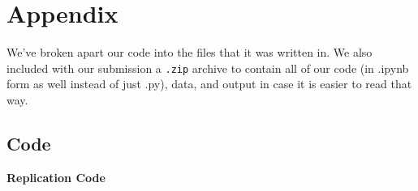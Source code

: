 \documentclass[a4paper]{article}
\begin{document}
\section{Appendix}
We've broken apart our code into the files that it was written in. We also included with our submission a \texttt{.zip} archive to contain all of our code (in .ipynb form as well instead of just .py), data, and output in case it is easier to read that way. 
\makeatletter
{}
\makeatother
\subsection{Code}


\textbf{Replication Code}
\end{document}
